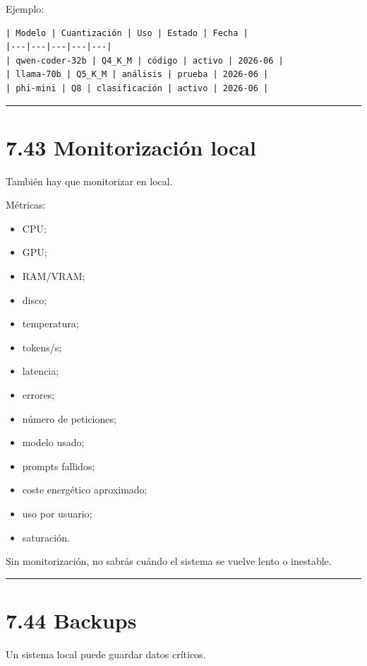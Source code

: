 Ejemplo:

\begin{lstlisting}
| Modelo | Cuantización | Uso | Estado | Fecha |
|---|---|---|---|---|
| qwen-coder-32b | Q4_K_M | código | activo | 2026-06 |
| llama-70b | Q5_K_M | análisis | prueba | 2026-06 |
| phi-mini | Q8 | clasificación | activo | 2026-06 |
\end{lstlisting}

\begin{center}\rule{0.5\linewidth}{0.5pt}\end{center}

\section{7.43 Monitorización local}\label{monitorizaciuxf3n-local}

También hay que monitorizar en local.

Métricas:

\begin{itemize}
\tightlist
\item
  CPU;
\item
  GPU;
\item
  RAM/VRAM;
\item
  disco;
\item
  temperatura;
\item
  tokens/s;
\item
  latencia;
\item
  errores;
\item
  número de peticiones;
\item
  modelo usado;
\item
  prompts fallidos;
\item
  coste energético aproximado;
\item
  uso por usuario;
\item
  saturación.
\end{itemize}

Sin monitorización, no sabrás cuándo el sistema se vuelve lento o
inestable.

\begin{center}\rule{0.5\linewidth}{0.5pt}\end{center}

\section{7.44 Backups}\label{backups}

Un sistema local puede guardar datos críticos.

